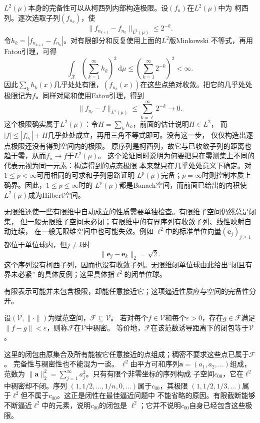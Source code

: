 $L^2(\mu)$本身的完备性可以从柯西列内部构造极限。设$(f_n)$在$L^2(\mu)$中为
柯西列。逐次选取子列$(f_{n_k})$，使
\[
  \lVert f_{n_{k+1}}-f_{n_k}\rVert_{L^2(\mu)}
  \leq 2^{-k}.
\]
令$h_k=|f_{n_{k+1}}-f_{n_k}|$。对有限部分和反复使用上面的$L^2$版Minkowski
不等式，再用Fatou引理，可得
\[
  \int_{\mathcal{X}}
  \left(\sum_{k=1}^{\infty}h_k\right)^2
  \,\mathrm{d}\mu
  \leq
  \left(\sum_{k=1}^{\infty}2^{-k}\right)^2
  <\infty.
\]
因此$\sum_k h_k(x)$几乎处处有限，$(f_{n_k}(x))$在这些点绝对收敛。把它的几乎处处
极限记为$f$。同样对尾和使用Fatou引理，得到
\[
  \lVert f_{n_\ell}-f\rVert_{L^2(\mu)}
  \leq
  \sum_{k=\ell}^{\infty}2^{-k}
  \longrightarrow0.
\]
这个极限确实属于$L^2(\mu)$：令$H=\sum_k h_k$，前面的估计说明$H\in L^2$，
而$|f|\leq |f_{n_1}|+H$几乎处处成立，再用三角不等式即可。没有这一步，
仅仅构造出逐点极限还没有得到空间内的极限。
原序列是柯西列，故它与已收敛子列的距离也趋于零，从而$f_n\to f$于$L^2(\mu)$。
这个论证同时说明为何要把只在零测集上不同的代表元视为同一元素：构造得到的点态极限
本来就只在几乎处处意义下确定。对$1\leq p<\infty$可用相同的可求和子列思路证明
$L^p(\mu)$完备；$p=\infty$时则控制本质上确界。因此，$1\leq p\leq\infty$时的
$L^p(\mu)$都是Banach空间，而前面已给出的内积使$L^2(\mu)$成为Hilbert空间。

无限维还使一些有限维中自动成立的性质需要单独检查。有限维子空间仍然总是闭集，
但一般无限维子空间未必闭；有限维中的有界序列有收敛子列、线性映射自动连续，
在一般无限维空间中也可能失效。例如
$\ell^2$中的标准单位向量$(\bm{e}_j)_{j\geq1}$都位于单位球内，但$j\neq k$时
\[
  \lVert\bm{e}_j-\bm{e}_k\rVert_2=\sqrt{2}.
\]
这个序列没有柯西子列，因而也没有收敛子列。无限维闭单位球由此给出“闭且有界未必紧”
的具体反例；这里具体指$\ell^2$的闭单位球。

有限表示可能并未包含极限，却能任意接近它；这项逼近性质应与空间的完备性分开。
\begin{definition}[稠密子集]
\label{def:functional-density}
设$(\mathcal V,\lVert\cdot\rVert)$为赋范空间，$\mathcal F\subseteq\mathcal V$。
若对每个$f\in\mathcal V$和每个$\varepsilon>0$，存在$g\in\mathcal F$满足
$\lVert f-g\rVert<\varepsilon$，则称$\mathcal F$在$\mathcal V$中稠密。
等价地，$\mathcal F$在该范数诱导距离下的闭包等于$\mathcal V$。
\end{definition}
这里的闭包由原集合及所有能被它任意接近的点组成；稠密不要求这些点已属于$\mathcal F$。
完备性与稠密性也不能混为一谈。
$\ell^2$由平方可和序列$\bm{a}=(a_1,a_2,\ldots)$组成，范数为
$\lVert\bm{a}\rVert_2^2=\sum_{j=1}^{\infty}a_j^2$。只有有限个非零坐标的序列构成
子空间$c_{00}$，它在$\ell^2$中稠密却不闭。序列
$(1,1/2,\ldots,1/n,0,\ldots)$属于$c_{00}$，其极限
$(1,1/2,1/3,\ldots)$属于$\ell^2$但不属于$c_{00}$。这正是闭性在最佳逼近问题中
不能省略的原因。有限截断能够不断逼近$\ell^2$中的元素，说明$c_{00}$的闭包是
$\ell^2$；它并不说明$c_{00}$自身已经包含这些极限。

